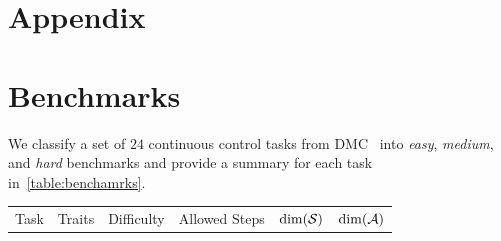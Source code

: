 \appendix
\section*{Appendix}



\section{Benchmarks}
\label{section:benchmarks}
We classify a set of $24$ continuous control tasks from DMC~\citep{tassa2018dmcontrol} into \textit{easy}, \textit{medium}, and \textit{hard} benchmarks and provide a summary for each task in~\cref{table:benchamrks}.


\begin{table}[!h]
\centering
\begin{tabular}{lccccc}
\hline
Task & Traits &  Difficulty & Allowed Steps &$\mathrm{dim}({\mathcal{S}})$ & $\mathrm{dim}({\mathcal{A}})$   \\


\end{tabular}
\end{table}
